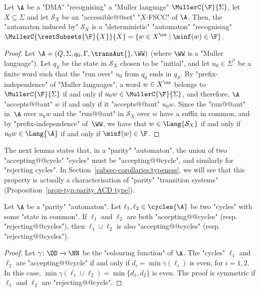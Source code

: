 \documentclass[10pt,a4paper]{amsart}
\renewcommand{\S}{\mathcal{S}}
\renewcommand{\gg}{\gamma}
\renewcommand{\SS}{\Sigma}
\begin{document}
\begin{lemma}\label{lemma-ZT:X-FSCC-induce-automata}
	Let $\A$ be a "DMA" "recognising" a "Muller language" $\MullerC{\F}{\SS}$, let $X\subseteq \SS$ and let $\S_X$ be an "accessible@@set" "$X$-FSCC" of $\A$. Then, the "automaton induced by" $\S_X$ is a "deterministic" "automaton" "recognising" $\MullerC{\restSubsets{\F}{X}}{X} = \{w\in X^\oo \mid \minf(w)\in \F\}$.
\end{lemma}
\begin{proof}
	Let $\A = (Q,\Sigma, q_0, \Gamma, \transAut{}, \WW)$ (where $\WW$ is a "Muller language"). Let $q_S$ be the state in $\S_X$ chosen to be "initial", and let $u_0\in \SS^*$ be a finite word such that the "run over" $u_0$ from $q_0$ ends in $q_S$.
	By "prefix-independence" of "Muller languages", a word $w\in X^\oo$ belongs to $\MullerC{\F}{\SS}$ if and only if $u_0w\in \MullerC{\F}{\SS}$, and therefore, $\A$ "accepts@@aut" $w$ if and only if it "accepts@@aut" $u_0w$. 
	Since the "run@@aut" in~$\A$ over $u_0w$ and the "run@@aut" in $\S_X$ over $w$ have a suffix in common, and by "prefix-independence" of~$\WW$, we have that $w\in \Lang{\S_X}$ if and only if $u_0w\in \Lang{\A}$ if and only if $\minf(w)\in \F$.
\end{proof}

The next lemma states that, in a "parity" "automaton", the union of two "accepting@@cycle" "cycles" must be "accepting@@cycle", and similarly for "rejecting cycles". 
In Section~\ref{subsec-corollaries:typeness}, we will see that this property is actually a characterisation of "parity" "transition systems" (Proposition~\ref{prop-typ:parity ACD type}).
\begin{lemma}\label{lemma-ZT:union_cycles_parity-TS}
	Let $\A$ be a "parity" "automaton". Let $\ell_1, \ell_2\in \cycles{\A}$ be two "cycles" with some "state in common". If $\ell_1$ and $\ell_2$ are both "accepting@@cycles" (resp. "rejecting@@cycles"), then $\ell_1 \cup \ell_2$ is also "accepting@@cycles" (resp. "rejecting@@cycles").
\end{lemma}
\begin{proof}
	Let $\gg\colon \DD\to \NN$ be the "colouring function" of $\A$. The "cycles" $\ell_1$ and $\ell_2$ are "accepting@@cycle" if and only if $d_i = \min \gg(\ell_i)$ is even, for $i=1,2$. In this case, $\min \gg(\ell_1 \cup \ell_2) = \min\{ d_1, d_2\}$ is even. The proof is symmetric if $\ell_1$ and $\ell_2$ are "rejecting@@cycle".
\end{proof}
\end{document}
